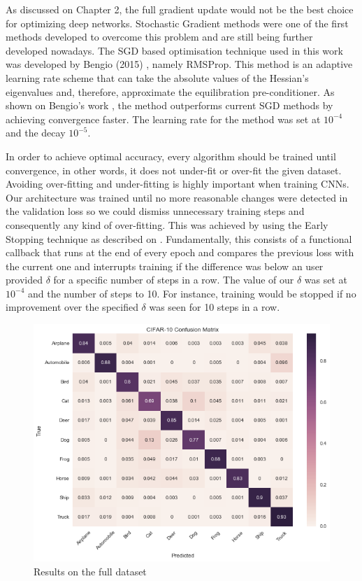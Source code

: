As discussed on Chapter 2, the full gradient update would not be the best choice for optimizing deep networks. Stochastic Gradient methods were one of the first methods developed to overcome this problem and are still being further developed nowadays. The SGD based optimisation technique used in this work was developed by Bengio (2015) \cite{bengiormsprop}, namely RMSProp. This method is an adaptive learning rate scheme that can take the absolute values of the Hessian's eigenvalues and, therefore, approximate the equilibration pre-conditioner. As shown on Bengio's work \cite{bengiormsprop}, the method outperforms current SGD methods by achieving convergence faster. The learning rate for the method was set at $10^{-4}$ and the decay $10^{-5}$.

In order to achieve optimal accuracy, every algorithm should be trained until convergence, in other words, it does not under-fit or over-fit the given dataset. Avoiding over-fitting and under-fitting is highly important when training CNNs. Our architecture was trained until no more reasonable changes were detected in the validation loss so we could dismiss unnecessary training steps and consequently any kind of over-fitting. This was achieved by using the Early Stopping technique as described on \cite{stanford2016}. Fundamentally, this consists of a functional callback that runs at the end of every epoch and compares the previous loss with the current one and interrupts training if the difference was below an user provided $\delta$ for a specific number of steps in a row. The value of our $\delta$ was set at $10^{-4}$ and the number of steps to 10. For instance, training would be stopped if no improvement over the specified $\delta$ was seen for 10 steps in a row.

\begin{figure}[!h]
	\centering
	\includegraphics[scale=0.6]{conf_matrix.png}
	\caption{Results on the full dataset}
	\label{fig:conf_matrix_full}
\end{figure}

